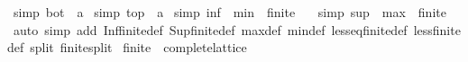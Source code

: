 \begin{isabellebody}
\isamarkupfalse%
\ {\isacharbrackleft}{\kern0pt}simp{\isacharbrackright}{\kern0pt}{\isacharcolon}{\kern0pt}\ {\isachardoublequoteopen}bot\ {\isacharequal}{\kern0pt}\ a\isanewline
{}\isamarkupfalse%
\ {\isacharbrackleft}{\kern0pt}simp{\isacharbrackright}{\kern0pt}{\isacharcolon}{\kern0pt}\ {\isachardoublequoteopen}top\ {\isacharequal}{\kern0pt}\ a\isanewline
{}\isamarkupfalse%
\ {\isacharbrackleft}{\kern0pt}simp{\isacharbrackright}{\kern0pt}{\isacharcolon}{\kern0pt}\ {\isachardoublequoteopen}inf\ {\isacharequal}{\kern0pt}\ {\isacharparenleft}{\kern0pt}min\ {\isacharcolon}{\kern0pt}{\isacharcolon}{\kern0pt}\ finite{\isacharunderscore}{\kern0pt}{}\ {\isasymRightarrow}\ {\isacharunderscore}{\kern0pt}{\isacharparenright}{\kern0pt}{\isachardoublequoteclose}\isanewline
{}\isamarkupfalse%
\ {\isacharbrackleft}{\kern0pt}simp{\isacharbrackright}{\kern0pt}{\isacharcolon}{\kern0pt}\ {\isachardoublequoteopen}sup\ {\isacharequal}{\kern0pt}\ {\isacharparenleft}{\kern0pt}max\ {\isacharcolon}{\kern0pt}{\isacharcolon}{\kern0pt}\ finite{\isacharunderscore}{\kern0pt}{}\ {\isasymRightarrow}\ {\isacharunderscore}{\kern0pt}{\isacharparenright}{\kern0pt}{\isachardoublequoteclose}\isanewline
\isanewline
{}\isamarkupfalse%
\isanewline
%
\isadelimproof
%
\endisadelimproof
%
\isatagproof
{}\isamarkupfalse%
\isanewline
{}\isamarkupfalse%
\ {\isacharparenleft}{\kern0pt}auto\ simp\ add{\isacharcolon}{\kern0pt}\ Inf{\isacharunderscore}{\kern0pt}finite{\isacharunderscore}{\kern0pt}{}{\isacharunderscore}{\kern0pt}def\ Sup{\isacharunderscore}{\kern0pt}finite{\isacharunderscore}{\kern0pt}{}{\isacharunderscore}{\kern0pt}def\ max{\isacharunderscore}{\kern0pt}def\ min{\isacharunderscore}{\kern0pt}def\ less{\isacharunderscore}{\kern0pt}eq{\isacharunderscore}{\kern0pt}finite{\isacharunderscore}{\kern0pt}{}{\isacharunderscore}{\kern0pt}def\ less{\isacharunderscore}{\kern0pt}finite{\isacharunderscore}{\kern0pt}{}{\isacharunderscore}{\kern0pt}def\ split{\isacharcolon}{\kern0pt}\ finite{\isacharunderscore}{\kern0pt}{}{\isachardot}{\kern0pt}split{\isacharparenright}{\kern0pt}%
\endisatagproof
{\isafoldproof}%
%
\isadelimproof
\isanewline
%
\endisadelimproof
{}\isamarkupfalse%
\isanewline
\isanewline
{}\isamarkupfalse%
\ finite{\isacharunderscore}{\kern0pt}{}\ {\isacharcolon}{\kern0pt}{\isacharcolon}{\kern0pt}\ complete{\isacharunderscore}{\kern0pt}lattice%

\end{isabellebody}
